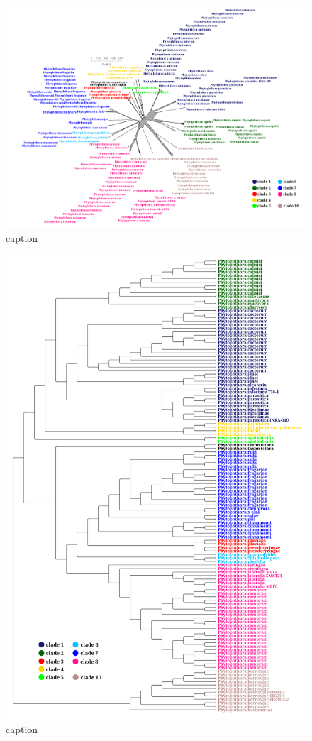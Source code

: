 \begin{figure}
  \centering
  \includegraphics[width=1.0\textwidth]{figures/fmhdist_mandal_outline_k21_s2000.png}
  \caption{caption}
  \label{fig:mandalFmhdistOutline}
\end{figure}

\begin{figure}
  \centering
  \includegraphics[width=1.0\textwidth]{figures/mashtree_mandal_tree_k21_s2000.png}
  \caption{caption}
  \label{fig:mandalMashOutline}
\end{figure}


